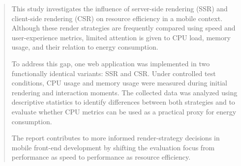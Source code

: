 \begin{abstract}
This study investigates the influence of server-side rendering (SSR) and client-side rendering (CSR) on resource efficiency in a mobile context. Although these render strategies are frequently compared using speed and user-experience metrics, limited attention is given to CPU load, memory usage, and their relation to energy consumption.

To address this gap, one web application was implemented in two functionally identical variants: SSR and CSR. Under controlled test conditions, CPU usage and memory usage were measured during initial rendering and interaction moments. The collected data was analyzed using descriptive statistics to identify differences between both strategies and to evaluate whether CPU metrics can be used as a practical proxy for energy consumption.

The report contributes to more informed render-strategy decisions in mobile front-end development by shifting the evaluation focus from performance as speed to performance as resource efficiency.
\end{abstract}
